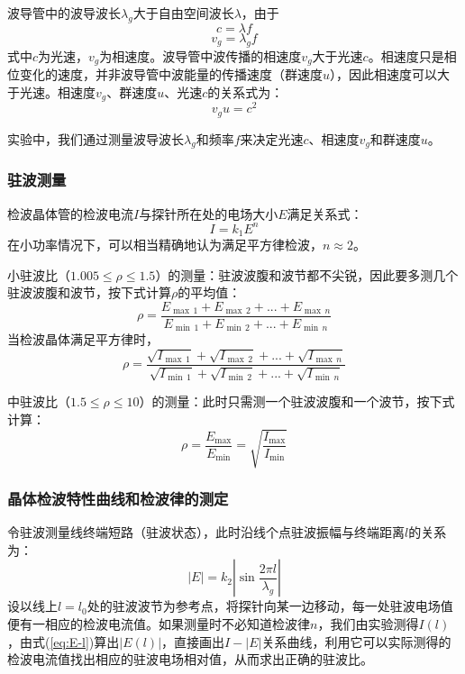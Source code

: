 \documentclass[aps,pre,12pt,preprint,onecolumn,showpacs,showkeys]{revtex4-1}
\begin{document}
        波导管中的波导波长$\lambda_g$大于自由空间波长$\lambda$，由于
        \begin{equation}
            c=\lambda f
        \end{equation}
        \begin{equation}
            v_g=\lambda_g f
        \end{equation}
        式中$c$为光速，$v_g$为相速度。波导管中波传播的相速度$v_g$大于光速$c$。相速度只是相位变化的速度，并非波导管中波能量的传播速度（群速度$u$），因此相速度可以大于光速。相速度$v_g$、群速度$u$、光速$c$的关系式为：
        \begin{equation}
            v_g u = c^2
        \end{equation}
        
        实验中，我们通过测量波导波长$\lambda_g$和频率$f$来决定光速$c$、相速度$v_g$和群速度$u$。

        \subsubsection{驻波测量}
        检波晶体管的检波电流$I$与探针所在处的电场大小$E$满足关系式：
        \begin{equation}
            I=k_1 E^n
        \end{equation}
        在小功率情况下，可以相当精确地认为满足平方律检波，$n\approx 2$。

        小驻波比（$1.005 \le \rho \le 1.5$）的测量：驻波波腹和波节都不尖锐，因此要多测几个驻波波腹和波节，按下式计算$\rho$的平均值：
        \begin{equation}
            \rho =\frac{E_{\max\,1}+E_{\max\,2}+...+E_{\max\,n}}{E_{\min\,1}+E_{\min\,2}+...+E_{\min\,n}}
        \end{equation}
        当检波晶体满足平方律时，
        \begin{equation}
            \rho =\frac{\sqrt{I_{\max\,1}}+\sqrt{I_{\max\,2}}+...+\sqrt{I_{\max\,n}}}{\sqrt{I_{\min\,1}}+\sqrt{I_{\min\,2}}+...+\sqrt{I_{\min\,n}}}
        \end{equation}

        中驻波比（$1.5\le \rho \le 10$）的测量：此时只需测一个驻波波腹和一个波节，按下式计算：
        \begin{equation}
            \rho = \frac{E_{\max}}{E_{\min}}=\sqrt{\frac{I_{\max}}{I_{\min}}}
        \end{equation}
        
        \subsubsection{晶体检波特性曲线和检波律的测定}
        令驻波测量线终端短路（驻波状态），此时沿线个点驻波振幅与终端距离$l$的关系为：
        \begin{equation}
            |E|=k_2 \left|\sin \frac{2 \pi l}{\lambda_ g}\right|\label{eq:E-l}
        \end{equation}
        设以线上$l=l_0$处的驻波波节为参考点，将探针向某一边移动，每一处驻波电场值便有一相应的检波电流值。如果测量时不必知道检波律$n$，我们由实验测得$I(l)$，由式(\ref{eq:E-l})算出$|E(l)|$，直接画出$I-|E|$关系曲线，利用它可以实际测得的检波电流值找出相应的驻波电场相对值，从而求出正确的驻波比。
\end{document}
